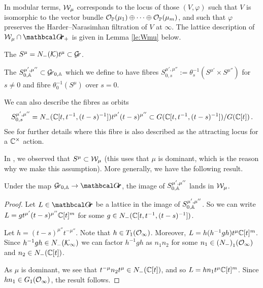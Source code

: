 \documentclass{article}
\begin{document}
In modular terms, $\cW_\mu$ corresponds to the locus of those $ (V, \varphi)$ such that $ V $ is isomorphic to the vector bundle $ \cO_{\PP}(\mu_1) \oplus \cdots \oplus \cO_{\PP}(\mu_m)$, and such that $ \varphi$ preserves the {Harder--Narasimhan filtration of $V$ at $ \infty$}. The lattice description of $ \cW_\mu \cap \Grth_+$ is given in Lemma \ref{le:Wmu} below. 
% 
\begin{definition} 
\label{def:inftyorbit}
    The  $ S^\mu = N_-(\cK)t^\mu \subset \Gr $.
\end{definition}
% 
\begin{definition} 
\label{def:inftyorbitfam}
    The  $S^{\mu', \mu''}_{0,\AA} \subset \Grbd$ which we define to have fibres $ S^{\mu', \mu''}_{0,s} := \theta_s^{-1}( S^{\mu'}\times S^{\mu''}) $ for $ s \ne 0$ and fibre $ \theta_0^{-1}(S^{\mu})$ over $ s = 0 $.
\end{definition}
% 
We can also describe the fibres as orbits
$$
    S^{\mu', \mu''}_{0,s} = 
    N_-(\CC[t, t^{-1}, (t-s)^{-1}])t^{\mu'} (t-s)^{\mu''} \subset G(\CC[t,t^{-1}, (t-s)^{-1}]) / G(\CC[t]) \,. 
$$
See \cite[Section~5.2]{baumann2020bases} for further details where this fibre is also described as the attracting locus for a $\Cx$ action.

In \cite[Prop~2.6]{kamnitzer2014yangians}, we observed that $ S^\mu \subset \cW_\mu$ (this uses that $\mu$ is dominant, which is the reason why we make this assumption).  More generally, we have the following result.

\begin{lemma}
\label{le:inftyfusiskl} 
    Under the map $ \Grbd \rightarrow \Grth$, the image of $ S^{\mu', \mu''}_{0,\AA}$ lands in $ \cW_\mu$.
\end{lemma}
% 
\begin{proof}
    Let $ L \in\Grth$ be a lattice in the image of $S^{\mu',\mu''}_{0,\AA}$. So we can write $ L = g t^{\mu'} (t-s)^{\mu''}\CC[t]^m$ for some $ g \in N_-(\CC[t, t^{-1}, (t-s)^{-1}]) $. 
    
    Let $ h =(t-s)^{\mu''} t^{-\mu''}  $.  Note that $ h \in T_1(\Oinf)$. 
    Moreover, $L = h (h^{-1} g h) t^{\mu}\CC[t]^m$. 
    Since $h^{-1} g h \in N_-(\cK_\infty)$ we can factor $ h^{-1} g h$ as $n_1 n_2$ for some $ n_1 \in {(N_-)}_1(\Oinf)$ and $n_2 \in {N_-}(\CC[t]) $. 
    
    As $ \mu $ is dominant, we see that $ t^{-\mu} n_2 t^\mu \in N_-(\CC[t]) $, and so $ L = h n_1 t^\mu \CC[t]^m$.  Since $ hn_1 \in G_1(\Oinf)$, the result follows. 
\end{proof}
% 
\end{document}
